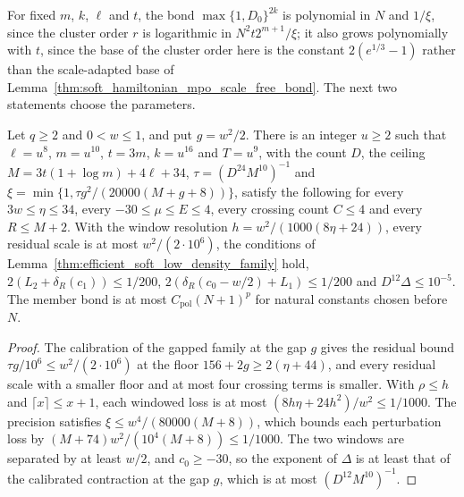 For fixed $m$, $k$, $\ell$ and $t$, the bond $\max\{1,D_0\}^{2k}$ is polynomial
in $N$ and $1/\xi$, since the cluster order $r$ is logarithmic in
$N^2t2^{m+1}/\xi$; it also grows polynomially with $t$, since the base of the
cluster order here is the constant $2(e^{1/3}-1)$ rather than the scale-adapted
base of Lemma~\ref{thm:soft_hamiltonian_mpo_scale_free_bond}.
The next two statements choose the parameters.

\begin{lemma}
    \label{lem:soft_low_density_calibration_budgets}
    \leanok

    Let $q\geq2$ and $0<w\leq1$, and put $g=w^2/2$. There is an integer $u\geq2$
    such that $\ell=u^8$, $m=u^{10}$, $t=3m$, $k=u^{16}$ and $T=u^9$, with the
    count $D$, the ceiling $M=3t(1+\log m)+4\ell+34$, $\tau=(D^{24}M^{10})^{-1}$ and
    $\xi=\min\{1,\tau g^2/(20000(M+g+8))\}$, satisfy the following for every
    $3w\leq\eta\leq34$, every $-30\leq\mu\leq E\leq4$, every crossing count
    $C\leq4$ and every $R\leq M+2$. With the window resolution
    $h=w^2/(1000(8\eta+24))$, every residual scale is at most $w^2/(2\cdot10^6)$,
    the conditions of Lemma~\ref{thm:efficient_soft_low_density_family} hold,
    $2(L_2+\delta_R(c_1))\leq1/200$, $2(\delta_R(c_0-w/2)+L_1)\leq1/200$ and
    $D^{12}\Delta\leq10^{-5}$. The member bond is at most $C_{\mathrm{pol}}(N+1)^{p}$
    for natural constants chosen before $N$.
\end{lemma}
\begin{proof}\leanok
    The calibration of the gapped family at the gap $g$ gives the residual bound
    $\tau g/10^6\leq w^2/(2\cdot10^6)$ at the floor $156+2g\geq2(\eta+44)$, and
    every residual scale with a smaller floor and at most four crossing terms is
    smaller. With $\rho\leq h$ and $\lceil x\rceil\leq x+1$, each windowed loss is
    at most $(8h\eta+24h^2)/w^2\leq1/1000$. The precision satisfies
    $\xi\leq w^4/(80000(M+8))$, which bounds each perturbation loss by
    $(M+74)w^2/(10^4(M+8))\leq1/1000$. The two windows are separated by at least
    $w/2$, and $c_0\geq-30$, so the exponent of $\Delta$ is at least that of the
    calibrated contraction at the gap $g$, which is at most $(D^{12}M^{10})^{-1}$.
\end{proof}

